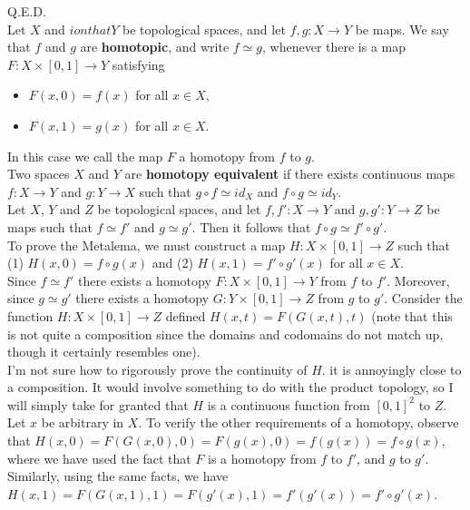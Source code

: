 \documentclass{article}
\begin{document}
Q.E.D.
\\



 Let $X$ and $ion that Y$ be topological spaces, and let $f,g:X\rightarrow Y$ be maps. We say that $f$ and $g$ are \textbf{homotopic}, and write $f\simeq g$, whenever there is a map $F:X\times [0,1]\rightarrow Y$ satisfying 
\begin{itemize}
    \item $F(x,0) = f(x)$ for all $x\in X$,
    \item $F(x,1) = g(x)$ for all $x\in X$.
\end{itemize}
In this case we call the map $F$ a homotopy from $f$ to $g$.\\

 Two spaces $X$ and $Y$ are \textbf{homotopy equivalent} if there exists continuous maps $f:X\rightarrow Y$ and $g:Y\rightarrow X$ such that $g\circ f \simeq id_X$ and $f\circ g \simeq id_Y$.\\

 Let $X$, $Y$ and $Z$ be topological spaces, and let $f,f':X\rightarrow Y$ and $g,g':Y\rightarrow Z$ be maps such that $f\simeq f'$ and $g\simeq g'$. Then it follows that $f\circ g\simeq f'\circ g'$. 
\\
 To prove the Metalema, we must construct a map $H:X\times [0,1]\rightarrow Z$ such that (1) $H(x,0) = f\circ g(x)$ and (2) $H(x,1) = f'\circ g'(x)$ for all $x\in X$.\\
Since $f\simeq f'$ there exists a homotopy $F:X\times[0,1]\rightarrow Y$ from $f$ to $f'$. Moreover, since $g\simeq g'$ there exists a homotopy $G:Y\times [0,1]\rightarrow Z$ from $g$ to $g'$. Consider the function $H:X\times[0,1]\rightarrow Z$ defined $H(x,t) = F(G(x,t),t)$ (note that this is not quite a composition since the domains and codomains do not match up, though it certainly resembles one).  \\

I'm not sure how to rigorously prove the continuity of $H$. it is annoyingly close to a composition. It would involve something to do with the product topology, so I will simply take for granted that $H$ is a continuous function from $[0,1]^2$ to $Z$. \\

Let $x$ be arbitrary in $X$. To verify the other requirements of a homotopy, observe that $H(x,0) = F(G(x,0),0) = F(g(x),0) = f(g(x)) = f\circ g(x)$, where we have used the fact that $F$ is a homotopy from $f$ to $f'$, and $g$ to $g'$. Similarly, using the same facts, we have $H(x,1) = F(G(x,1),1) = F(g'(x),1) = f'(g'(x)) = f'\circ g'(x)$.\\
\end{document}
